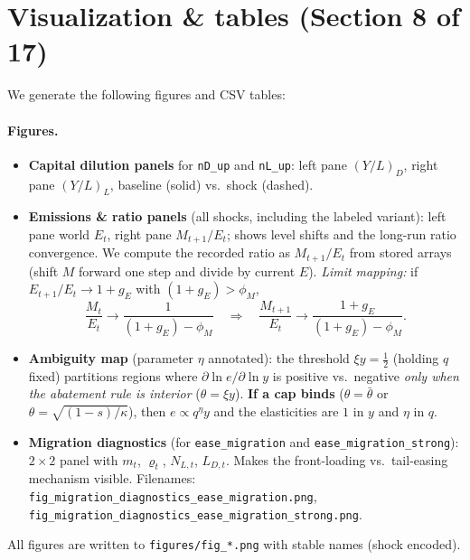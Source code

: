 \documentclass[12pt,a4paper]{article}
\newcommand{\code}[1]{\texttt{#1}}
\begin{document}
\section{Visualization \& tables (Section 8 of 17)}
We generate the following figures and CSV tables:

\paragraph{Figures.}
\begin{itemize}[leftmargin=1.25em]
  \item \textbf{Capital dilution panels} for \code{nD\_up} and \code{nL\_up}: left pane \((Y/L)_D\), right pane \((Y/L)_L\), baseline (solid) vs.\ shock (dashed).

  \item \textbf{Emissions \& ratio panels} (all shocks, including the labeled variant): left pane world \(E_t\), right pane \(M_{t+1}/E_t\); shows level shifts and the long-run ratio convergence. We compute the recorded ratio as \(M_{t+1}/E_t\) from stored arrays (shift \(M\) forward one step and divide by current \(E\)).
  \emph{Limit mapping:} if \(E_{t+1}/E_t\to 1+g_E\) with \((1+g_E)>\phi_M\),
  \[
  \frac{M_t}{E_t}\to \frac{1}{(1+g_E)-\phi_M}
  \quad\Longrightarrow\quad
  \frac{M_{t+1}}{E_t}\to \frac{1+g_E}{(1+g_E)-\phi_M}.
  \]

  \item \textbf{Ambiguity map} (parameter \(\eta\) annotated): the threshold \(\xi y=\tfrac{1}{2}\) (holding \(q\) fixed) partitions regions where \(\partial\ln e/\partial\ln y\) is positive vs.\ negative \emph{only when the abatement rule is interior} (\(\theta=\xi y\)). \textbf{If a cap binds} (\(\theta=\bar\theta\) or \(\theta=\sqrt{(1-s)/\kappa}\)), then \(e\propto q^{\eta}y\) and the elasticities are \(1\) in \(y\) and \(\eta\) in \(q\).

  \item \textbf{Migration diagnostics} (for \code{ease\_migration} and \code{ease\_migration\_strong}): \(2\times 2\) panel with \(m_t\), \(\varrho_t\), \(N_{L,t}\), \(L_{D,t}\). Makes the front-loading vs.\ tail-easing mechanism visible. Filenames: \nolinkurl{fig_migration_diagnostics_ease_migration.png}, \nolinkurl{fig_migration_diagnostics_ease_migration_strong.png}.
\end{itemize}

All figures are written to \code{figures/fig\_*.png} with stable names (shock encoded).
\end{document}
